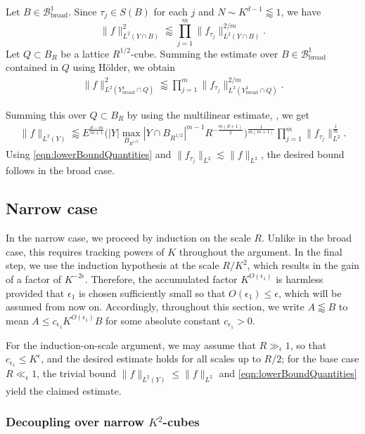 \documentclass[11pt]{amsart}
\theoremstyle{definition}
\theoremstyle{remark}
\numberwithin{equation}{section}
\newcommand{\Bb}{\mathcal{B}_{\operatorname{broad}}}
\newcommand{\Yb}{Y_{\operatorname{broad}}}
\newcommand{\les}{\lesssim}
\newcommand{\less}{\lessapprox}
\newcommand{\eps}{\epsilon}
\begin{document}
Let $B\in \Bb^1$. Since $\tau_j \in S(B)$ for each $j$ and $N\sim K^{d-1} \less 1$, we have 
\[ 
	\| f \|_{L^2(Y\cap B)}^2 \less  \prod_{j=1}^m \| f_{\tau_j} \|_{L^2(Y\cap B)}^{2/m}.
\]
Let $Q\subset B_R$ be a lattice $R^{1/2}$-cube. Summing the estimate over $B\in\Bb^1$ contained in $Q$ using H\"{o}lder, we obtain 
\begin{align*}
	\| f \|_{L^2(\Yb^1 \cap Q)}^2 \less \prod_{j=1}^m \| f_{\tau_j} \|_{L^2(\Yb^1\cap Q)}^{2/m}. 
\end{align*} 

Summing this over $Q\subset B_R$ by using the multilinear estimate, , we get
\begin{align*}
	\| f \|_{L^2(Y)} \less E^{\frac{d-m}{m+1}}
	 \Big( |Y|  \max_{B_{R^{1/2}}} |Y\cap B_{R^{1/2}}| ^{m-1}  
	R^{-\frac{m(d+1)}{2}} \Big)^{\frac{1}{m(m+1)}}  \prod_{j=1}^m   \| f_{\tau_j} \|_{L^2}^{\frac{1}{m}}.
\end{align*} 
Using \eqref{eqn:lowerBoundQuantities} and $ \| f_{\tau_j} \|_{L^2} \les \| f\|_{L^2}$, the desired bound follows in the broad case.

\subsection{Narrow case}
In the narrow case, we proceed by induction on the scale $R$. Unlike in the broad case, this requires tracking powers of $K$ throughout the argument. In the final step, we use the induction hypothesis at the scale $R/K^2$, which results in the gain of a factor of $K^{-2\eps}$. Therefore, the accumulated factor $K^{O(\eps_1)}$ is harmless  provided that $\eps_1$ is chosen sufficiently small so that $O(\eps_1)\leq \eps$, which will be assumed from now on. Accordingly, throughout this section, we write $A \less B$ to mean $A \leq c_{\eps_1} K^{O(\eps_1)} B$ for some absolute constant $c_{\eps_1}>0$.

For the induction-on-scale argument, we may assume that  $R \gg_\eps 1$, so that $c_{\eps_1} \leq K^\eps$, and the desired estimate holds for all scales up to $R/2$; for the base case $R \ll_\eps 1$, the trivial bound $\| f\|_{L^2(Y)}\leq \| f\|_{L^2}$  and \eqref{eqn:lowerBoundQuantities} yield the claimed estimate. 

\subsubsection{Decoupling over narrow $K^2$-cubes}
\end{document}
